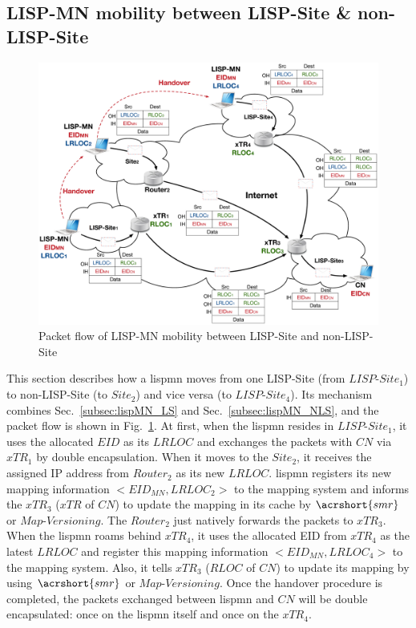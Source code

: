  \subsection{LISP-MN mobility between LISP-Site \&  non-LISP-Site}
 \label{subsec:MN_NLS}
\begin{figure}[!t]
	\centering
	\includegraphics[width=\textwidth]{Pics/LISP-MN_in_LISP-Site_non-LISP-Site.eps}
	\caption{Packet flow of LISP-MN mobility between LISP-Site and non-LISP-Site}
	\label{LISP-MN_in_LISP-Site_non-LISP-Site}
\end{figure}
This section describes how a \acrshort{lispmn} moves from one LISP-Site (from $LISP\text{-}Site_1$) to non-LISP-Site (to $Site_2$) and vice versa (to $LISP\text{-}Site_4$). Its mechanism combines Sec.~\ref{subsec:lispMN_LS} and Sec.~\ref{subsec:lispMN_NLS}, and the packet flow is shown in Fig.~\ref{LISP-MN_in_LISP-Site_non-LISP-Site}. At first, when the \acrshort{lispmn} resides in $LISP\text{-}Site_1$, it uses the allocated $EID$ as its $LRLOC$ and exchanges the packets with $CN$ via $xTR_1$ by double encapsulation. When it moves to the $Site_2$, it receives the assigned IP address from $Router_2$ as its new $LRLOC$. \acrshort{lispmn} registers its new mapping information ${<EID_{MN}, LRLOC_2>}$ to the mapping system and informs the ${xTR_3}$ ($xTR$ of $CN$) to update the mapping in its cache by $\acrshort{smr}$ or $Map\textbf{-}Versioning$. The $Router_2$ just natively forwards the packets to $xTR_3$. When the \acrshort{lispmn} roams behind $xTR_4$, it uses the allocated EID from $xTR_4$ as the latest $LRLOC$ and register this mapping information ${<EID_{MN}, LRLOC_4>}$ to the mapping system. Also, it tells ${xTR_3}$ ($RLOC$ of $CN$) to update its mapping by using $\acrshort{smr}$ or $Map\textbf{-}Versioning$. Once the handover procedure is completed, the packets exchanged between \acrshort{lispmn} and $CN$ will be double encapsulated: once on the \acrshort{lispmn} itself and once on the $xTR_4$.



